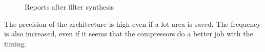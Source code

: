 \documentclass[a4paper]{article}
\begin{document}
	\begin{figure}[H]
			\centering
			\hfill
			\caption{Reports after filter synthesis}
		\end{figure}

	The precision of the architecture is high even if a lot area is saved. The frequency is also increased, even if it seems that the compressors do a better job with the timing.
\end{document}
